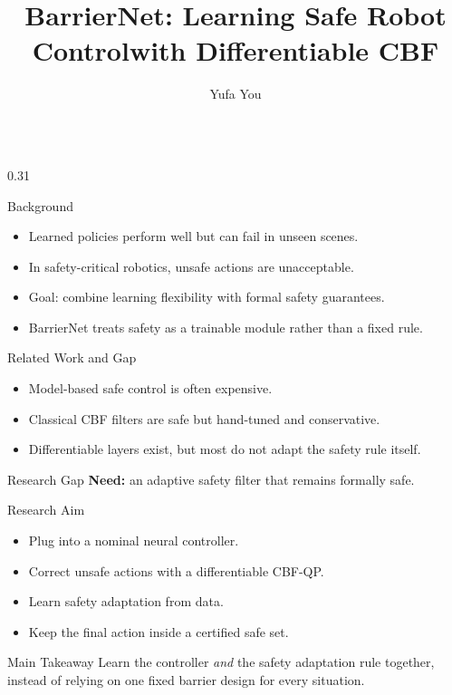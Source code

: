 \documentclass[final]{beamer}
\title{BarrierNet: Learning Safe Robot Control\texorpdfstring{\newline}{}with Differentiable CBF}
\author{Yufa You}
\institute[]{Department of Aeronautical and Aviation Engineering, The Hong Kong Polytechnic University}
\begin{document}
\begin{frame}[t]{}
\begin{columns}[t,totalwidth=\textwidth]

\begin{column}{0.31\textwidth}

\begin{block}{Background}
\begin{itemize}
  \item Learned policies perform well but can fail in unseen scenes.
  \item In safety-critical robotics, unsafe actions are unacceptable.
  \item Goal: combine learning flexibility with formal safety guarantees.
  \item BarrierNet treats safety as a trainable module rather than a fixed rule.
\end{itemize}
\end{block}

\begin{block}{Related Work and Gap}
\begin{itemize}
  \item Model-based safe control is often expensive.
  \item Classical CBF filters are safe but hand-tuned and conservative.
  \item Differentiable layers exist, but most do not adapt the safety rule itself.
\end{itemize}

\vspace{0.6cm}
\begin{alertblock}{Research Gap}
\textbf{Need:} an adaptive safety filter that remains formally safe.
\end{alertblock}
\end{block}

\begin{block}{Research Aim}
\begin{itemize}
  \item Plug into a nominal neural controller.
  \item Correct unsafe actions with a differentiable CBF-QP.
  \item Learn safety adaptation from data.
  \item Keep the final action inside a certified safe set.
\end{itemize}
\end{block}

\begin{exampleblock}{Main Takeaway}
\Large
Learn the controller \emph{and} the safety adaptation rule together,\\
instead of relying on one fixed barrier design for every situation.
\end{exampleblock}


\end{column}
\end{columns}
\end{frame}
\end{document}
